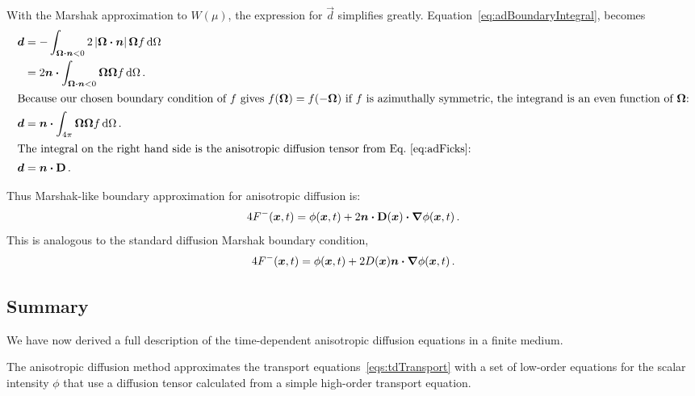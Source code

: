 With the Marshak approximation to $W(\mu)$, the expression for $\vec{d}$
simplifies greatly.  Equation~\eqref{eq:adBoundaryIntegral}, becomes
\begin{align*}
  \bm{d} &=
  -\int_{\bm{\Omega}\bm{\cdot}\bm{n} < 0} 2 \left| \bm{\Omega}\bm{\cdot}\bm{n} \right|
  \bm{\Omega} f \mathop{}\!\mathrm{d}\Omega
  \\
  &= 
  2 \bm{n}\bm{\cdot} \int_{\bm{\Omega}\bm{\cdot}\bm{n} < 0} \bm{\Omega}
  \bm{\Omega} f \mathop{}\!\mathrm{d}\Omega \,.
  \\
  \intertext{Because our chosen boundary condition of $f$ gives
  $f(\bm{\Omega})=f(-\bm{\Omega})$ if $f$ is azimuthally symmetric, the
  integrand is an even function of $\bm{\Omega}$:}
   \bm{d} &=
  \bm{n}\bm{\cdot}\int_{4\pi} \bm{\Omega} \bm{\Omega} f \mathop{}\!\mathrm{d}\Omega \,.
  \\ 
  \intertext{The integral on the right hand side is the anisotropic diffusion
  tensor from Eq.~\eqref{eq:adFicks}:}
  \bm{d} &= \bm{n}\bm{\cdot}\mathbf{D} \,.
\end{align*}

Thus Marshak-like boundary approximation for anisotropic diffusion is:
\begin{equation}\label{eq:marshakAd}
  4 F^-(\bm{x}, t)
  = \phi(\bm{x}, t)
  + 2 \bm{n} \bm{\cdot} \mathbf{D}(\bm{x}) \bm{\cdot} \bm{\nabla} \phi(\bm{x}, t) \,.
\end{equation}
This is analogous to the standard diffusion Marshak boundary condition,
\begin{equation*}
  4 F^-(\bm{x}, t) = \phi(\bm{x}, t)
  + 2 D(\bm{x}) \bm{n} \bm{\cdot} \bm{\nabla} \phi(\bm{x}, t)\,.
\end{equation*}

\subsection{Summary}
We have now derived a full description of the time-dependent anisotropic
diffusion equations in a finite medium. 

The anisotropic diffusion method approximates the transport
equations~\eqref{eqs:tdTransport} with a set of low-order equations for the
scalar intensity $\phi$ that use a diffusion tensor calculated from a
simple high-order transport equation.

